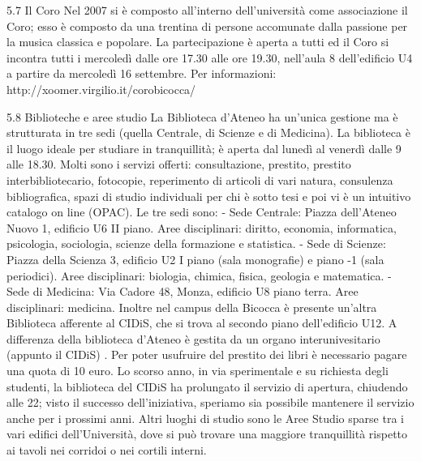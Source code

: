 5.7 Il Coro
Nel 2007 si è composto all'interno dell'università come associazione il Coro; esso è composto da una trentina di persone accomunate dalla passione per la musica classica e popolare. La partecipazione è aperta a tutti ed il Coro si incontra tutti i mercoledì dalle ore 17.30 alle ore 19.30, nell'aula 8 dell'edificio U4 a partire da mercoledì 16 settembre. Per informazioni: http://xoomer.virgilio.it/corobicocca/

5.8 Biblioteche e aree studio
La Biblioteca d'Ateneo ha un'unica gestione ma è strutturata in tre sedi (quella Centrale, di Scienze e di Medicina). La biblioteca è il luogo ideale per studiare in tranquillità; è aperta dal lunedì al venerdì dalle 9 alle 18.30. Molti sono i servizi offerti: consultazione, prestito, prestito interbibliotecario, fotocopie, reperimento di articoli di vari natura, consulenza bibliografica, spazi di studio individuali per chi è sotto tesi e poi vi è un intuitivo catalogo on line (OPAC). 
Le tre sedi sono:
      - Sede Centrale: Piazza dell'Ateneo Nuovo 1, edificio U6 II piano. Aree disciplinari: diritto, economia, informatica, psicologia, sociologia, scienze della formazione e statistica. 
      - Sede di Scienze: Piazza della Scienza 3, edificio U2 I piano (sala monografie) e piano -1 (sala periodici). Aree disciplinari: biologia, chimica, fisica, geologia e matematica. 
      - Sede di Medicina: Via Cadore 48, Monza, edificio U8 piano terra. Aree disciplinari: medicina. 
Inoltre nel campus della Bicocca è presente un'altra Biblioteca afferente al CIDiS, che si trova al secondo piano dell'edificio U12. A differenza della biblioteca d'Ateneo è gestita da un organo interunivesitario (appunto il CIDiS) . Per poter usufruire del prestito dei libri è necessario pagare una quota di 10 euro. Lo scorso anno, in via sperimentale e su richiesta degli studenti, la biblioteca del CIDiS ha prolungato il servizio di apertura, chiudendo alle 22; visto il successo dell'iniziativa, speriamo sia possibile mantenere il servizio anche per i prossimi anni. 
Altri luoghi di studio sono le Aree Studio sparse tra i vari edifici dell'Università, dove si può trovare una maggiore tranquillità rispetto ai tavoli nei corridoi o nei cortili interni.

